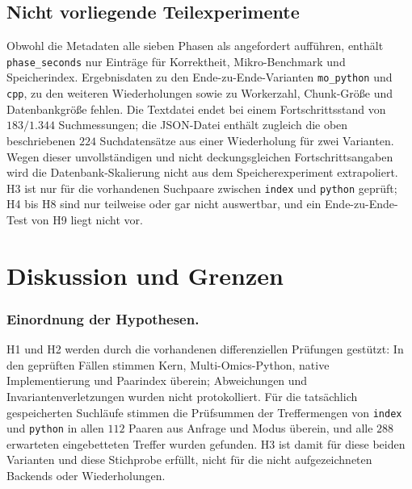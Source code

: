 \documentclass[a4paper,12pt, twoside]{report}
\theoremstyle{definition}
\begin{document}
\subsection{Nicht vorliegende Teilexperimente}

Obwohl die Metadaten alle sieben Phasen als angefordert aufführen, enthält \texttt{phase\_seconds} nur Einträge für Korrektheit, Mikro-Benchmark und Speicherindex. Ergebnisdaten zu den Ende-zu-Ende-Varianten \texttt{mo\_python} und \texttt{cpp}, zu den weiteren Wiederholungen sowie zu Workerzahl, Chunk-Größe und Datenbankgröße fehlen. Die Textdatei endet bei einem Fortschrittsstand von $183/1.344$ Suchmessungen; die JSON-Datei enthält zugleich die oben beschriebenen $224$ Suchdatensätze aus einer Wiederholung für zwei Varianten. Wegen dieser unvollständigen und nicht deckungsgleichen Fortschrittsangaben wird die Datenbank-Skalierung nicht aus dem Speicherexperiment extrapoliert. H3 ist nur für die vorhandenen Suchpaare zwischen \texttt{index} und \texttt{python} geprüft; H4 bis H8 sind nur teilweise oder gar nicht auswertbar, und ein Ende-zu-Ende-Test von H9 liegt nicht vor.

\section{Diskussion und Grenzen}
\label{sec:ucx_diskussion}

\subsubsection{Einordnung der Hypothesen.} H1 und H2 werden durch die vorhandenen differenziellen Prüfungen gestützt: In den geprüften Fällen stimmen Kern, Multi-Omics-Python, native Implementierung und Paarindex überein; Abweichungen und Invariantenverletzungen wurden nicht protokolliert. Für die tatsächlich gespeicherten Suchläufe stimmen die Prüfsummen der Treffermengen von \texttt{index} und \texttt{python} in allen $112$ Paaren aus Anfrage und Modus überein, und alle $288$ erwarteten eingebetteten Treffer wurden gefunden. H3 ist damit für diese beiden Varianten und diese Stichprobe erfüllt, nicht für die nicht aufgezeichneten Backends oder Wiederholungen.
\end{document}
